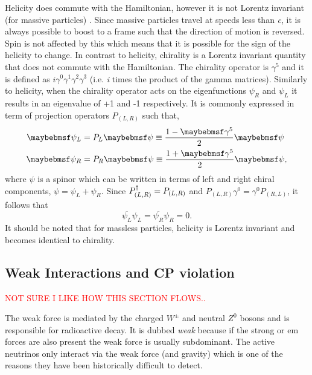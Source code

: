 Helicity does commute with the Hamiltonian, however it is not Lorentz invariant (for massive particles) \cite{Introduction_to_Particle_and_Astroparticle_Physics_book}. Since massive particles travel at speeds less than \textit{c}, it is always possible to boost to a frame such that the direction of motion is reversed. Spin is not affected by this which means that it is possible for the sign of the helicity to change. In contrast to helicity, chirality is a Lorentz invariant quantity that does not commute with the Hamiltonian. The chirality operator is $\gamma^5$ and it is defined as $i\gamma^0\gamma^1\gamma^2\gamma^3$ (i.e. \textit{i} times the product of the gamma matrices). Similarly to helicity, when the chirality operator acts on the eigenfunctions $\psi_R$ and $\psi_L$ it results in an eigenvalue of +1 and -1 respectively. It is commonly expressed in term of projection operators $P_{(L, R)}$ such that,
\begin{equation}
\begin{split}
    \psi_L &= P_L\psi \isdefined \frac{1-\gamma^5}{2}\psi \\
    \psi_R &= P_R\psi \isdefined \frac{1+\gamma^5}{2}\psi,
\end{split}
\end{equation}
where $\psi$ is a spinor which can be written in terms of left and right chiral components, $\psi = \psi_L + \psi_R$.
Since $P_{(L,R)}^\dagger = P_{(L,R)}$ and $P_{(L,R)}\gamma^0 = \gamma^0P_{(R,L)}$, it follows that
\begin{equation}\label{eqn:chiral identity}
    \overline{\psi_L}\psi_L = \overline{\psi_R}\psi_R = 0.
\end{equation}
It should be noted that for massless particles, helicity is Lorentz invariant and becomes identical to chirality.  
\cite{Fundamentals_of_Neutrino_Physics_and_Astrophysics}

\subsection{Weak Interactions and CP violation}
\textcolor{red}{NOT SURE I LIKE HOW THIS SECTION FLOWS..}

The weak force is mediated by the charged $W^\pm$ and neutral $Z^0$ bosons and is responsible for radioactive decay. It is dubbed \textit{weak} because if the strong or \gls{em} forces are also present the weak force is usually subdominant. The active neutrinos only interact via the weak force (and gravity) which is one of the reasons they have been historically difficult to detect. 

